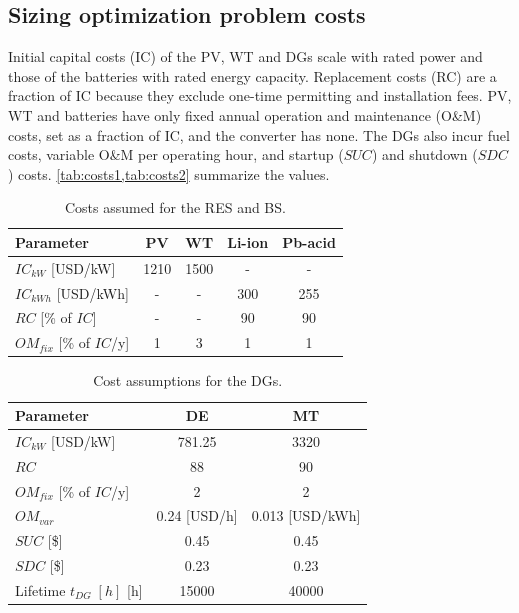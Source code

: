 \documentclass[final,3p,times]{elsarticle}
\begin{document}
\subsection{Sizing optimization problem costs}

Initial capital costs (IC) of the PV, WT and DGs scale with rated power and those of the batteries with rated energy capacity. Replacement costs (RC) are a fraction of IC because they exclude one-time permitting and installation fees. PV, WT and batteries have only fixed annual operation and maintenance (O\&M) costs, set as a fraction of IC, and the converter has none. The DGs also incur fuel costs, variable O\&M per operating hour, and startup ($SUC$) and shutdown ($SDC$) costs. \cref{tab:costs1,tab:costs2} summarize the values.

\begin{table}[htbp]
\centering
\begin{tabular}{@{}lcccc@{}}
\toprule
\textbf{Parameter}        & PV   & WT   & Li-ion & Pb-acid \\ \midrule
$IC_{kW}$ [USD/kW]           & 1210 & 1500 & -      & -       \\
$IC_{kWh}$ [USD/kWh]           & -    & -    & 300    & 255     \\
$RC$ [\% of $IC$]         & -    & -    & 90     & 90      \\
$OM_{fix}$ [\% of $IC$/y] & 1    & 3    & 1      & 1       \\ \bottomrule
\end{tabular}
\caption{Costs assumed for the RES and BS.}
\label{tab:costs1}
\end{table}

\begin{table}[htbp]
\centering
\begin{tabular}{@{}lcc@{}}
\toprule
\textbf{Parameter} & DE \cite{moshi2016}    & MT \cite{chp_mt}    \\ \midrule
$IC_{kW}$ [USD/kW]     & 781.25 & 3320  \\
$RC$                 & 88     & 90    \\
$OM_{fix}$ [\% of $IC$/y]          & 2      & 2     \\
$OM_{var}$            & 0.24 [USD/h]   & 0.013 [USD/kWh] \\
$SUC$ [\$]                & 0.45   & 0.45  \\
$SDC$ [\$]               & 0.23   & 0.23  \\
Lifetime $t_{DG} \; [h]$ [h]  & 15000  & 40000 \\ 
\bottomrule
\end{tabular}
\caption{Cost assumptions for the DGs.}
\label{tab:costs2}
\end{table}
\end{document}

